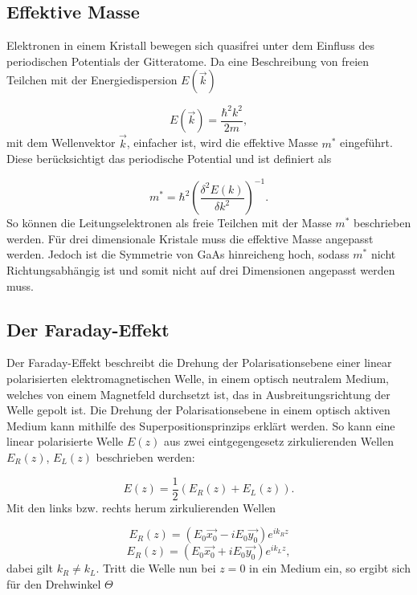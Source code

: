 \subsection{Effektive Masse}
Elektronen in einem Kristall bewegen sich quasifrei unter dem Einfluss des periodischen Potentials der Gitteratome.
Da eine Beschreibung von freien Teilchen mit der Energiedispersion $E(\vec{k})$

\begin{equation}
    E(\vec{k}) = \frac{\hbar^2 k^2}{2m},
\end{equation}
mit dem Wellenvektor $\vec{k}$, einfacher ist, wird die effektive Masse $m^*$ eingeführt.
Diese berücksichtigt das periodische Potential und ist definiert als 

\begin{equation}
    m^* = \hbar^2 \left(\frac{\delta^2 E(k)}{\delta k^2}\right)^{-1}.
\end{equation}
So können die Leitungselektronen als freie Teilchen mit der Masse $m^*$ beschrieben werden.
Für drei dimensionale Kristale muss die effektive Masse angepasst werden. 
Jedoch ist die Symmetrie von GaAs hinreicheng hoch, sodass $m^*$ nicht Richtungsabhängig ist und somit 
nicht auf drei Dimensionen angepasst werden muss.

\subsection{Der Faraday-Effekt}
Der Faraday-Effekt beschreibt die Drehung der Polarisationsebene einer linear polarisierten elektromagnetischen Welle, 
in einem optisch neutralem Medium, welches von einem Magnetfeld durchsetzt ist, das in Ausbreitungsrichtung der 
Welle gepolt ist.
Die Drehung der Polarisationsebene in einem optisch aktiven Medium kann mithilfe des Superpositionsprinzips erklärt werden.
So kann eine linear polarisierte Welle $E(z)$ aus zwei eintgegengesetz zirkulierenden Wellen $E_R(z)$, $E_L(z)$ 
beschrieben werden:

\begin{equation}
    E(z) = \frac{1}{2} \left(E_R(z) + E_L(z)\right).
\end{equation}
Mit den links bzw. rechts herum zirkulierenden Wellen

\begin{equation}
    E_R(z) = (E_0 \vec{x_0} - i E_0 \vec{y_0}) e^{i k_R z}
\end{equation}
\begin{equation}
    E_R(z) = (E_0 \vec{x_0} + i E_0 \vec{y_0}) e^{i k_L z},
\end{equation}
dabei gilt $k_R \neq k_L$.
Tritt die Welle nun bei $z = 0$ in ein Medium ein, so ergibt sich für den Drehwinkel $\Theta$ 

